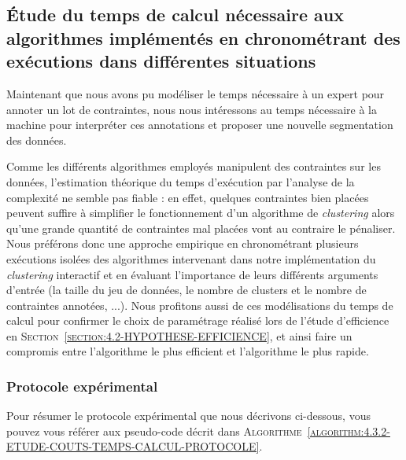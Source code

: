 	\subsection{Étude du temps de calcul nécessaire aux algorithmes implémentés en chronométrant des exécutions dans différentes situations}
	\label{section:4.3.2-ETUDE-COUTS-TEMPS-CALCUL}
		
		Maintenant que nous avons pu modéliser le temps nécessaire à un expert pour annoter un lot de contraintes, nous nous intéressons au temps nécessaire à la machine pour interpréter ces annotations et proposer une nouvelle segmentation des données.
		
		Comme les différents algorithmes employés manipulent des contraintes sur les données, l'estimation théorique du temps d'exécution par l'analyse de la complexité ne semble pas fiable : en effet, quelques contraintes bien placées peuvent suffire à simplifier le fonctionnement d'un algorithme de \textit{clustering} alors qu'une grande quantité de contraintes mal placées vont au contraire le pénaliser.
		Nous préférons donc une approche empirique en chronométrant plusieurs exécutions isolées des algorithmes intervenant dans notre implémentation du \textit{clustering} interactif et en évaluant l'importance de leurs différents arguments d'entrée (la taille du jeu de données, le nombre de clusters et le nombre de contraintes annotées, ...).
		Nous profitons aussi de ces modélisations du temps de calcul pour confirmer le choix de paramétrage réalisé lors de l'étude d'efficience en \textsc{Section~\ref{section:4.2-HYPOTHESE-EFFICIENCE}}, et ainsi faire un compromis entre l'algorithme le plus efficient et l'algorithme le plus rapide.
	
		\subsubsection{Protocole expérimental}
			
			Pour résumer le protocole expérimental que nous décrivons ci-dessous, vous pouvez vous référer aux pseudo-code décrit dans \textsc{Algorithme~\ref{algorithm:4.3.2-ETUDE-COUTS-TEMPS-CALCUL-PROTOCOLE}}.
			
